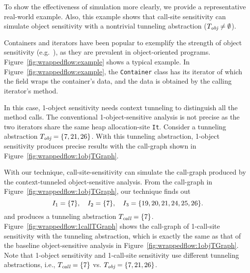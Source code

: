 


\label{sec:simulation:real-world}
To show the effectiveness of simulation more clearly, we provide a representative real-world example.
Also, this example shows that call-site sensitivity can simulate object sensitivity with a nontrivial tunneling abstraction ($T_{\text{\it obj}} \neq \emptyset$).



{
Containers and iterators have been popular to exemplify the strength
of object sensitivity (e.g.~\cite{Milanova2005,JeJeOh18,TanLX16}), as
they are prevalent in object-oriented
programs.
Figure~\ref{fig:wrappedflow:example} shows a typical example.
In Figure~\ref{fig:wrappedflow:example}, the {\tt Container} class has
its iterator of which the field wraps the container's
data, and the data is obtained by the calling iterator's method.
}

{
In this case, 1-object sensitivity needs context tunneling to distinguish all the method calls.
The conventional 1-object-sensitive analysis is not precise as
the two iterators share the same heap allocation-site {\tt It}. 
Consider a tunneling abstraction
$T_{\text{\it obj}} =\{7, 21, 26\}$.
With this tunneling abstraction, 1-object sensitivity produces precise
results with the
call-graph shown in Figure~\ref{fig:wrappedflow:1objTGraph}.
}


{
With our technique, call-site-sensitivity can simulate the call-graph
produced by the context-tunneled object-sensitive analysis. 
From the call-graph in Figure~\ref{fig:wrappedflow:1objTGraph}, our
technique finds out
\[
I_1 = \{ 7 \}, \quad  I_2 = \{7\},\quad I_3 =
\{19,20,21,24,25,26\}.
\]
and produces a tunneling abstraction $T_{\text{\it call}} = \{7\}$.
Figure~\ref{fig:wrappedflow:1callTGraph} shows the call-graph of
1-call-site sensitivity with the tunneling abstraction, which is
exactly the same as that of the baseline object-sensitive analysis
in Figure~\ref{fig:wrappedflow:1objTGraph}.
Note that 1-object sensitivity and 1-call-site sensitivity use
different tunneling abstractions, i.e., $T_{\text{\it call}} = \{7\}$ vs.
$T_{\text{\it obj}} = \{7, 21, 26\}$. 
}



